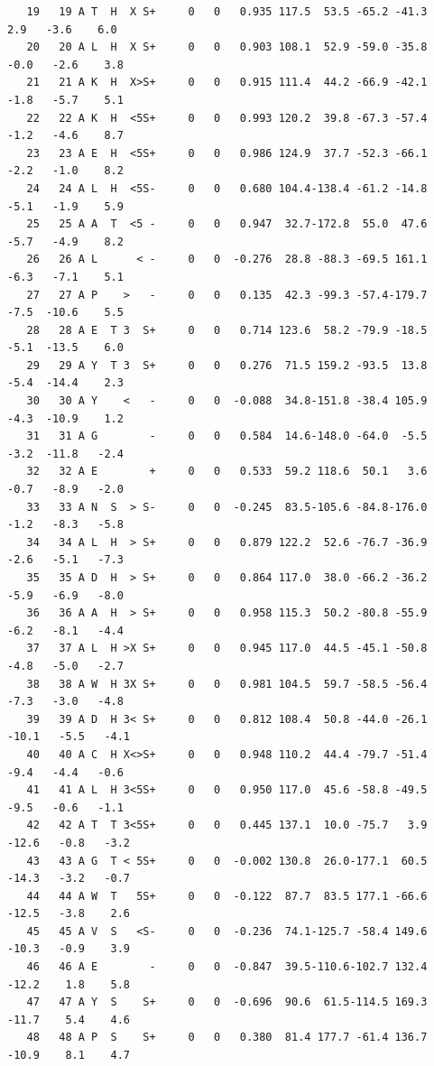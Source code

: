 \documentclass[12pt]{article}
\begin{document}
\begin{lstlisting}
   19   19 A T  H  X S+     0   0   0.935 117.5  53.5 -65.2 -41.3    2.9   -3.6    6.0
   20   20 A L  H  X S+     0   0   0.903 108.1  52.9 -59.0 -35.8   -0.0   -2.6    3.8
   21   21 A K  H  X>S+     0   0   0.915 111.4  44.2 -66.9 -42.1   -1.8   -5.7    5.1
   22   22 A K  H  <5S+     0   0   0.993 120.2  39.8 -67.3 -57.4   -1.2   -4.6    8.7
   23   23 A E  H  <5S+     0   0   0.986 124.9  37.7 -52.3 -66.1   -2.2   -1.0    8.2
   24   24 A L  H  <5S-     0   0   0.680 104.4-138.4 -61.2 -14.8   -5.1   -1.9    5.9
   25   25 A A  T  <5 -     0   0   0.947  32.7-172.8  55.0  47.6   -5.7   -4.9    8.2
   26   26 A L      < -     0   0  -0.276  28.8 -88.3 -69.5 161.1   -6.3   -7.1    5.1
   27   27 A P    >   -     0   0   0.135  42.3 -99.3 -57.4-179.7   -7.5  -10.6    5.5
   28   28 A E  T 3  S+     0   0   0.714 123.6  58.2 -79.9 -18.5   -5.1  -13.5    6.0
   29   29 A Y  T 3  S+     0   0   0.276  71.5 159.2 -93.5  13.8   -5.4  -14.4    2.3
   30   30 A Y    <   -     0   0  -0.088  34.8-151.8 -38.4 105.9   -4.3  -10.9    1.2
   31   31 A G        -     0   0   0.584  14.6-148.0 -64.0  -5.5   -3.2  -11.8   -2.4
   32   32 A E        +     0   0   0.533  59.2 118.6  50.1   3.6   -0.7   -8.9   -2.0
   33   33 A N  S  > S-     0   0  -0.245  83.5-105.6 -84.8-176.0   -1.2   -8.3   -5.8
   34   34 A L  H  > S+     0   0   0.879 122.2  52.6 -76.7 -36.9   -2.6   -5.1   -7.3
   35   35 A D  H  > S+     0   0   0.864 117.0  38.0 -66.2 -36.2   -5.9   -6.9   -8.0
   36   36 A A  H  > S+     0   0   0.958 115.3  50.2 -80.8 -55.9   -6.2   -8.1   -4.4
   37   37 A L  H >X S+     0   0   0.945 117.0  44.5 -45.1 -50.8   -4.8   -5.0   -2.7
   38   38 A W  H 3X S+     0   0   0.981 104.5  59.7 -58.5 -56.4   -7.3   -3.0   -4.8
   39   39 A D  H 3< S+     0   0   0.812 108.4  50.8 -44.0 -26.1  -10.1   -5.5   -4.1
   40   40 A C  H X<>S+     0   0   0.948 110.2  44.4 -79.7 -51.4   -9.4   -4.4   -0.6
   41   41 A L  H 3<5S+     0   0   0.950 117.0  45.6 -58.8 -49.5   -9.5   -0.6   -1.1
   42   42 A T  T 3<5S+     0   0   0.445 137.1  10.0 -75.7   3.9  -12.6   -0.8   -3.2
   43   43 A G  T < 5S+     0   0  -0.002 130.8  26.0-177.1  60.5  -14.3   -3.2   -0.7
   44   44 A W  T   5S+     0   0  -0.122  87.7  83.5 177.1 -66.6  -12.5   -3.8    2.6
   45   45 A V  S   <S-     0   0  -0.236  74.1-125.7 -58.4 149.6  -10.3   -0.9    3.9
   46   46 A E        -     0   0  -0.847  39.5-110.6-102.7 132.4  -12.2    1.8    5.8
   47   47 A Y  S    S+     0   0  -0.696  90.6  61.5-114.5 169.3  -11.7    5.4    4.6
   48   48 A P  S    S+     0   0   0.380  81.4 177.7 -61.4 136.7  -10.9    8.1    4.7

\end{lstlisting}
\end{document}
